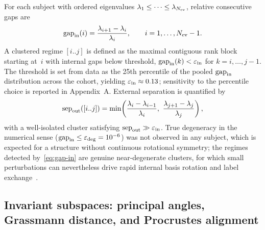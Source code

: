 \documentclass[11pt]{article}
\begin{document}
For each subject with ordered eigenvalues $\lambda_1\le\cdots\le\lambda_{N_{\rm ev}}$, relative consecutive gaps are
\begin{equation}
\mathrm{gap}_{\rm in}(i)=\frac{\lambda_{i+1}-\lambda_i}{\lambda_i},\qquad i=1,\ldots,N_{\rm ev}-1.
\label{eq:gap-in}
\end{equation}
A clustered regime $[i..j]$ is defined as the maximal contiguous rank block starting at~$i$ with internal gaps below threshold, $\mathrm{gap}_{\rm in}(k)<\varepsilon_{\rm in}$ for $k=i,\ldots,j-1$.
The threshold is set from data as the 25th percentile of the pooled $\mathrm{gap}_{\rm in}$ distribution across the cohort, yielding $\varepsilon_{\rm in}\approx 0.13$; sensitivity to the percentile choice is reported in Appendix~A.
External separation is quantified by
\begin{equation}
\mathrm{sep}_{\rm out}([i..j])=\min\!\left(\frac{\lambda_i-\lambda_{i-1}}{\lambda_i},\ \frac{\lambda_{j+1}-\lambda_j}{\lambda_j}\right),
\label{eq:sep-out}
\end{equation}
with a well-isolated cluster satisfying $\mathrm{sep}_{\rm out}\gg\varepsilon_{\rm in}$.
True degeneracy in the numerical sense ($\mathrm{gap}_{\rm in}\le\varepsilon_{\rm deg}=10^{-6}$) was not observed in any subject, which is expected for a structure without continuous rotational symmetry; the regimes detected by~\eqref{eq:gap-in} are genuine near-degenerate clusters, for which small perturbations can nevertheless drive rapid internal basis rotation and label exchange~\citep{Pierre1988,ManconiMace2017}.

\subsection{Invariant subspaces: principal angles, Grassmann distance, and Procrustes alignment}
\label{sec:subspace-methods}
\end{document}
